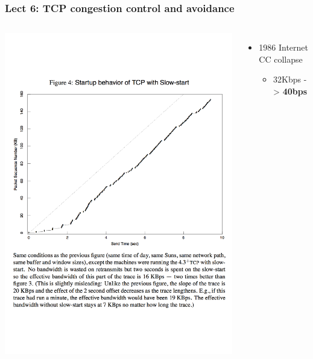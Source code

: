 \begin{frame}
  \frametitle{Lect 6: TCP congestion control and avoidance}

  \begin{columns}[T]
      \begin{center}
	\includegraphics[width=1.2\textwidth]{../../figures/vj-congestion-slow-start.pdf}
      \end{center}


      \pause

      \begin{itemize}
	\item 1986 Internet CC collapse
	\begin{itemize}
	  \item 32Kbps -> \textbf{40bps}
	\end{itemize}


\end{itemize}
\end{columns}
\end{frame}
